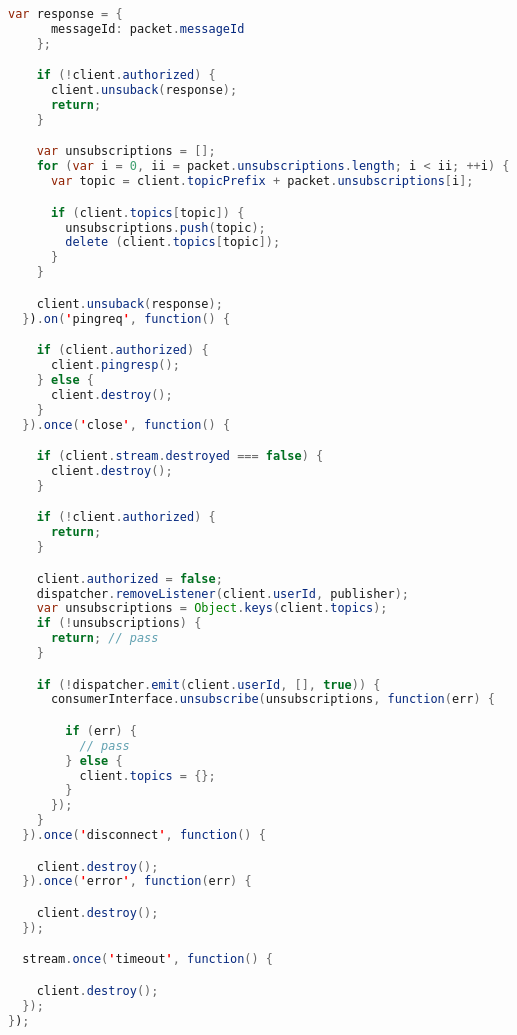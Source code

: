 \begin{lstlisting}[language=java, captionpos=b, caption={Dispatcher broker MQTT}, basicstyle=\scriptsize\ttfamily]
    var response = {
      messageId: packet.messageId
    };

    if (!client.authorized) {
      client.unsuback(response);
      return;
    }

    var unsubscriptions = [];
    for (var i = 0, ii = packet.unsubscriptions.length; i < ii; ++i) {
      var topic = client.topicPrefix + packet.unsubscriptions[i];

      if (client.topics[topic]) {
        unsubscriptions.push(topic);
        delete (client.topics[topic]);
      }
    }

    client.unsuback(response);
  }).on('pingreq', function() {

    if (client.authorized) {
      client.pingresp();
    } else {
      client.destroy();
    }
  }).once('close', function() {

    if (client.stream.destroyed === false) {
      client.destroy();
    }

    if (!client.authorized) {
      return;
    }

    client.authorized = false;
    dispatcher.removeListener(client.userId, publisher);
    var unsubscriptions = Object.keys(client.topics);
    if (!unsubscriptions) {
      return; // pass
    }

    if (!dispatcher.emit(client.userId, [], true)) {
      consumerInterface.unsubscribe(unsubscriptions, function(err) {

        if (err) {
          // pass
        } else {
          client.topics = {};
        }
      });
    }
  }).once('disconnect', function() {

    client.destroy();
  }).once('error', function(err) {

    client.destroy();
  });

  stream.once('timeout', function() {

    client.destroy();
  });
});
\end{lstlisting}
